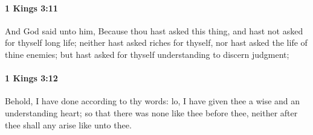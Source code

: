 		\paragraph{1 Kings 3:11} %
			\label{1KINGS-3-11}

			And God said unto him, Because thou hast asked this thing, and hast not asked for thyself long life; neither hast asked riches for thyself, nor hast asked the life of thine enemies; but hast asked for thyself understanding to discern judgment;


		\paragraph{1 Kings 3:12} %
			\label{1KINGS-3-12}

			Behold, I have done according to thy words: lo, I have given thee a wise and an understanding heart; so that there was none like thee before thee, neither after thee shall any arise like unto thee.

